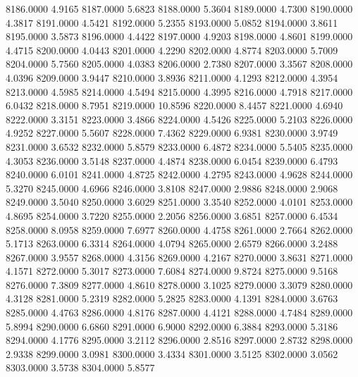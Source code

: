 8186.0000      4.9165
8187.0000      5.6823
8188.0000      5.3604
8189.0000      4.7300
8190.0000      4.3817
8191.0000      4.5421
8192.0000      5.2355
8193.0000      5.0852
8194.0000      3.8611
8195.0000      3.5873
8196.0000      4.4422
8197.0000      4.9203
8198.0000      4.8601
8199.0000      4.4715
8200.0000      4.0443
8201.0000      4.2290
8202.0000      4.8774
8203.0000      5.7009
8204.0000      5.7560
8205.0000      4.0383
8206.0000      2.7380
8207.0000      3.3567
8208.0000      4.0396
8209.0000      3.9447
8210.0000      3.8936
8211.0000      4.1293
8212.0000      4.3954
8213.0000      4.5985
8214.0000      4.5494
8215.0000      4.3995
8216.0000      4.7918
8217.0000      6.0432
8218.0000      8.7951
8219.0000     10.8596
8220.0000      8.4457
8221.0000      4.6940
8222.0000      3.3151
8223.0000      3.4866
8224.0000      4.5426
8225.0000      5.2103
8226.0000      4.9252
8227.0000      5.5607
8228.0000      7.4362
8229.0000      6.9381
8230.0000      3.9749
8231.0000      3.6532
8232.0000      5.8579
8233.0000      6.4872
8234.0000      5.5405
8235.0000      4.3053
8236.0000      3.5148
8237.0000      4.4874
8238.0000      6.0454
8239.0000      6.4793
8240.0000      6.0101
8241.0000      4.8725
8242.0000      4.2795
8243.0000      4.9628
8244.0000      5.3270
8245.0000      4.6966
8246.0000      3.8108
8247.0000      2.9886
8248.0000      2.9068
8249.0000      3.5040
8250.0000      3.6029
8251.0000      3.3540
8252.0000      4.0101
8253.0000      4.8695
8254.0000      3.7220
8255.0000      2.2056
8256.0000      3.6851
8257.0000      6.4534
8258.0000      8.0958
8259.0000      7.6977
8260.0000      4.4758
8261.0000      2.7664
8262.0000      5.1713
8263.0000      6.3314
8264.0000      4.0794
8265.0000      2.6579
8266.0000      3.2488
8267.0000      3.9557
8268.0000      4.3156
8269.0000      4.2167
8270.0000      3.8631
8271.0000      4.1571
8272.0000      5.3017
8273.0000      7.6084
8274.0000      9.8724
8275.0000      9.5168
8276.0000      7.3809
8277.0000      4.8610
8278.0000      3.1025
8279.0000      3.3079
8280.0000      4.3128
8281.0000      5.2319
8282.0000      5.2825
8283.0000      4.1391
8284.0000      3.6763
8285.0000      4.4763
8286.0000      4.8176
8287.0000      4.4121
8288.0000      4.7484
8289.0000      5.8994
8290.0000      6.6860
8291.0000      6.9000
8292.0000      6.3884
8293.0000      5.3186
8294.0000      4.1776
8295.0000      3.2112
8296.0000      2.8516
8297.0000      2.8732
8298.0000      2.9338
8299.0000      3.0981
8300.0000      3.4334
8301.0000      3.5125
8302.0000      3.0562
8303.0000      3.5738
8304.0000      5.8577
